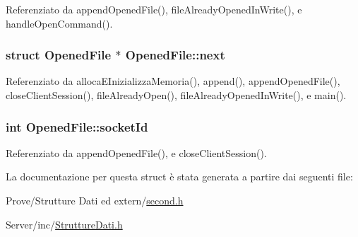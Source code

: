 Referenziato da append\+Opened\+File(), file\+Already\+Opened\+In\+Write(), e handle\+Open\+Command().

\hypertarget{structOpenedFile_a9b8c8b995cdda6da249a6ce9a9df98b2}{}
\subsubsection[{next}]{\setlength{\rightskip}{0pt plus 5cm}struct {\bf Opened\+File} $\ast$ Opened\+File\+::next}\label{structOpenedFile_a9b8c8b995cdda6da249a6ce9a9df98b2}


Referenziato da alloca\+E\+Inizializza\+Memoria(), append(), append\+Opened\+File(), close\+Client\+Session(), file\+Already\+Open(), file\+Already\+Opened\+In\+Write(), e main().

\hypertarget{structOpenedFile_a2af35018ecff06dbd349d464c815038a}{}
\subsubsection[{socket\+Id}]{\setlength{\rightskip}{0pt plus 5cm}int Opened\+File\+::socket\+Id}\label{structOpenedFile_a2af35018ecff06dbd349d464c815038a}


Referenziato da append\+Opened\+File(), e close\+Client\+Session().



La documentazione per questa struct è stata generata a partire dai seguenti file\+:\begin{DoxyCompactItemize}
\item 
Prove/\+Strutture Dati ed extern/\hyperlink{second_8h}{second.\+h}\item 
Server/inc/\hyperlink{StruttureDati_8h}{Strutture\+Dati.\+h}\end{DoxyCompactItemize}
